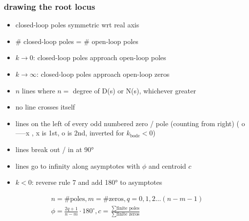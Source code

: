 \subsubsection*{drawing the root locus}
\begin{itemize}
    \item closed-loop poles symmetric wrt real axis
    \item \# closed-loop poles = \# open-loop poles
    \item $k \rightarrow 0$: closed-loop poles approach open-loop poles
    \item $k \rightarrow \infty$: closed-loop poles approach open-loop zeros
    \item $n$ lines where $n =$ degree of D(s) or N(s), whichever greater
    \item no line crosses itself
    \item lines on the left of every odd numbered zero / pole (counting from right) (    o-----x    , x is 1st, o is 2nd, inverted for $k_{\text{bode}} < 0$)
    \item lines break out / in at 90°
    \item lines go to infinity along asymptotes with $\phi$ and centroid $c$ 
    \item $k < 0$: reverse rule 7 and add 180° to asymptotes
\end{itemize}
\begin{align}
    n = \# \text{poles}, m = \# \text{zeros}, q = 0, 1, 2 \dots (n-m-1)\\
    \phi = \frac{2q + 1}{n-m} \cdot 180^{\circ}, c = \frac{\sum\text{finite poles}}{\sum\text{finite zeros}}
\end{align}